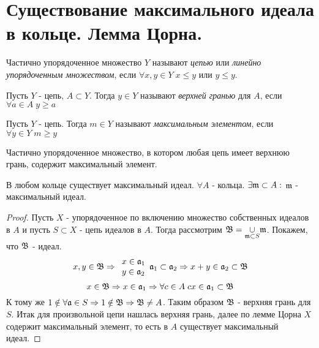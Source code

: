 \section{Существование максимального идеала в кольце. Лемма Цорна.}

\begin{defn}
  Частично упорядоченное множество $ Y $ называют \emph{цепью} или \emph{линейно упорядоченным множеством}, если
  $ \forall x, y \in Y \; x \le y $ или $ y \le y $.
\end{defn}

\begin{defn}
  Пусть $ Y $ - цепь, $ A \subset Y $. 
  Тогда $ y \in Y $ называют \emph{верхней гранью} для $ A $, если $ \forall a \in A \; y \ge a $
\end{defn}

\begin{defn}
  Пусть $ Y $ - цепь. Тогда $ m \in Y $ называют \emph{максимальным элементом}, если $ \forall y \in Y \; m \ge y $
\end{defn}

\begin{lem}[Цорна]
  Частично упорядоченное множество, в котором любая цепь имеет верхнюю грань, содержит максимальный элемент.
\end{lem}

\begin{thm}
  В любом кольце существует максимальный идеал. \newline
  $ \forall A $ - кольца. $ \exists \mathfrak{m} \subset A :$ $ \mathfrak{m} $ - максимальный идеал.
\end{thm}
\begin{proof}
  Пусть $ X $ - упорядоченное по включению множество собственных идеалов в $ A $ и 
  пусть $ S \subset X $ - цепь идеалов в $ A $. Тогда рассмотрим 
  $ \mathfrak{B} = \underset{\mathfrak{m} \subset S}{\cup} \mathfrak{m} $. Покажем, что $ \mathfrak{B} $ - идеал.
  \[ x, y \in \mathfrak{B} \Rightarrow \begin{array}{l l}
                       x \in \mathfrak{a}_{1} \\
		       y \in \mathfrak{a}_{2}
		     \end{array}  
		     \mathfrak{a}_{1} \subset \mathfrak{a}_{2} \Rightarrow x + y \in \mathfrak{a}_{2} \subset \mathfrak{B} \]
		     \[ x \in \mathfrak{B} \Rightarrow x \in \mathfrak{a}_{1} \Rightarrow \forall c \in A \; cx \in \mathfrak{a}_{1} \subset \mathfrak{B} \]
  К тому же $ 1 \notin \forall \mathfrak{a} \in S \Rightarrow 1 \notin \mathfrak{B} \Rightarrow \mathfrak{B} \ne A $. Таким образом
  $ \mathfrak{B} $ - верхняя грань для $ S $. Итак для произвольной цепи нашлась верхняя грань, далее по лемме Цорна $ X $ содержит 
  максимальный элемент, то есть в $ A $ существует максимальный идеал.
\end{proof}

